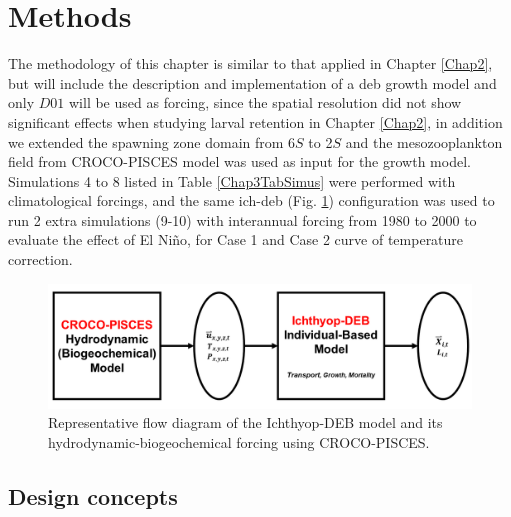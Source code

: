 \clearpage
\section{Methods}\label{Chap3Meth}
The methodology of this chapter is similar to that applied in Chapter \ref{Chap2}, but will include the description and implementation of a \acrshort{deb} growth model and only $D01$ will be used as forcing, since the spatial resolution did not show significant effects when studying larval
retention in Chapter \ref{Chap2}, in addition we extended the spawning zone domain from 6\textdegree $S$ to 2\textdegree $S$ and the mesozooplankton field from CROCO-PISCES model was used as input for the growth model. Simulations 4 to 8 listed in Table \ref{Chap3TabSimus} were performed with climatological forcings, and the same \gls{ich-deb} (Fig. \ref{Chap3Ichthyop-DEB}) configuration was used to run 2 extra simulations (9-10) with interannual forcing from 1980 to 2000 to evaluate the effect of El Ni\~{n}o, for Case 1 and Case 2 curve of temperature correction.\\

\begin{figure}[ht]
	\includegraphics[width=1.0\textwidth]{figures/Chap3Ichthyop-DEB.png}
	\centering
	\caption{Representative flow diagram of the Ichthyop-DEB model and its hydrodynamic-biogeochemical forcing using CROCO-PISCES.}
	\label{Chap3Ichthyop-DEB}
\end{figure}

\subsection{Design concepts}

